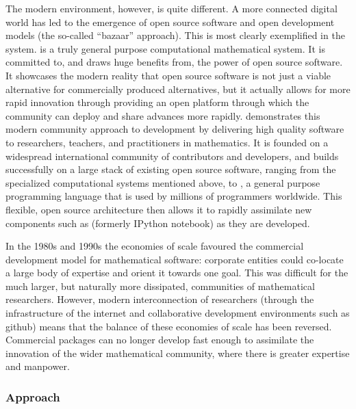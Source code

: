 The modern environment, however, is quite different. A more connected
digital world has led to the emergence of open source software and
open development models (the so-called ``bazaar'' approach). This is
most clearly exemplified in the \Sage system. \Sage is a truly
general purpose computational mathematical system. It is committed to,
and draws huge benefits from, the power of open source software.
It showcases the modern
reality that open source software is not just a viable alternative for
commercially produced alternatives, but it actually allows for more
rapid innovation through providing an open platform through which the
community can deploy and share advances more rapidly. \Sage demonstrates
this modern community approach to development by
delivering high quality software to researchers, teachers, and
practitioners in mathematics. It is founded on a widespread
international community of contributors and developers, and builds
successfully on a large stack of existing open source software,
ranging from the specialized computational systems mentioned above, to
\Python, a general purpose programming language that is used by
millions of programmers worldwide. This flexible, open source
architecture then allows it to rapidly assimilate new components such
as \Jupyter (formerly IPython notebook) as they are developed.

In the 1980s and 1990s the economies of scale favoured the commercial
development model for mathematical software: corporate entities could
co-locate a large body of expertise and orient it towards one
goal. This was difficult for the much larger, but naturally more
dissipated, communities of mathematical researchers. However, modern
interconnection of researchers (through the infrastructure of the
internet and collaborative development environments such as github)
means that the balance of these economies of scale has been
reversed. Commercial packages can no longer develop fast enough to
assimilate the innovation of the wider mathematical community, where
there is greater expertise and manpower.




\subsubsection{Approach}

